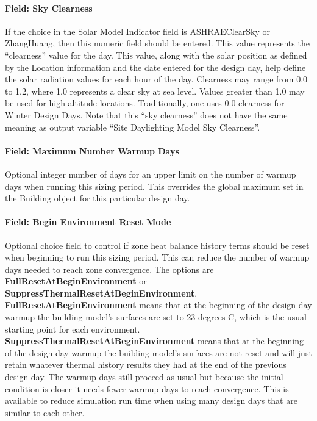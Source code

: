 \paragraph{Field: Sky Clearness}\label{field-sky-clearness}

If the choice in the Solar Model Indicator field is ASHRAEClearSky or ZhangHuang, then this numeric field should be entered. This value represents the ``clearness'' value for the day. This value, along with the solar position as defined by the Location information and the date entered for the design day, help define the solar radiation values for each hour of the day. Clearness may range from 0.0 to 1.2, where 1.0 represents a clear sky at sea level. Values greater than 1.0 may be used for high altitude locations. Traditionally, one uses 0.0 clearness for Winter Design Days. Note that this ``sky clearness'' does not have the same meaning as output variable ``Site Daylighting Model Sky Clearness''.

\paragraph{Field: Maximum Number Warmup Days}\label{field-max-num-warm-days}

Optional integer number of days for an upper limit on the number of warmup days when running this sizing period.  This overrides the global maximum set in the Building object for this particular design day.

\paragraph{Field: Begin Environment Reset Mode}\label{field-beg-env-reset-mode}

Optional choice field to control if zone heat balance history terms should be reset when beginning to run this sizing period.  This can reduce the number of warmup days needed to reach zone convergence.  The options are \textbf{FullResetAtBeginEnvironment} or \textbf{SuppressThermalResetAtBeginEnvironment}.  \textbf{FullResetAtBeginEnvironment} means that at the beginning of the design day warmup the building model's surfaces are set to 23 degrees C, which is the usual starting point for each environment.  \textbf{SuppressThermalResetAtBeginEnvironment} means that at the beginning of the design day warmup the building model's surfaces are not reset and will just retain whatever thermal history results they had at the end of the previous design day.  The warmup days still proceed as usual but because the initial condition is closer it needs fewer warmup days to reach convergence.  This is available to reduce simulation run time when using many design days that are similar to each other.


